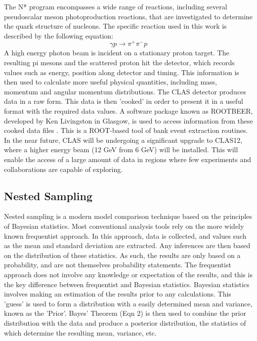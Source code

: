 \documentclass[a4paper,12pt]{article}
\begin{document}
The N* program encompasses a wide range of reactions, including several pseudoscalar meson photoproduction reactions, that are investigated to determine the quark structure of nucleons.  The specific reaction used in this work is described by the following equation:
\begin{equation}
 \gamma p \rightarrow \pi^{+} \pi^{-} p
\end{equation}
A high energy photon beam is incident on a stationary proton target.  The resulting pi mesons and the scattered proton hit the detector, which records values such as energy, position along detector and timing.  This information is then used to calculate more useful physical quantities, including mass, momentum and angular momentum distributions.\cite{nstar}  
\newline
The CLAS detector produces data in a raw form.  This data is then 'cooked' in order to present it in a useful format with the required data values.  A software package known as ROOTBEER, developed by Ken Livingston in Glasgow, is used to access information from these cooked data files \cite{rootbeer}.  This is a ROOT-based tool of bank event extraction routines.  
\newline
In the near future, CLAS will be undergoing a significant upgrade to CLAS12, where a higher energy beam (12 GeV from 6 GeV) will be installed.  This will enable the access of a large amount of data in regions where few experiments and collaborations are capable of exploring.  

\subsection{Nested Sampling}
Nested sampling is a modern model comparison technique based on the principles of Bayesian statistics.  Most conventional analysis tools rely on the more widely known frequentist approach. In this approach, data is collected, and values such as the mean and standard deviation are extracted.  Any inferences are then based on the distribution of these statistics.  As such, the results are only based on a probability, and are not themselves probability statements.  The frequentist approach does not involve any knowledge or expectation of the results, and this is the key difference between frequentist and Bayesian statistics. \cite{bayes}
\newline
Bayesian statistics involves making an estimation of the results prior to any calculations.  This 'guess' is used to form a distribution with a easily determined mean and variance, known as the 'Prior'.  Bayes' Theorem (Eqn 2) is then used to combine the prior distribution with the data and produce a posterior distribution, the statistics of which determine the resulting mean, variance, etc. \cite{sivia} 
\newline
\end{document}
